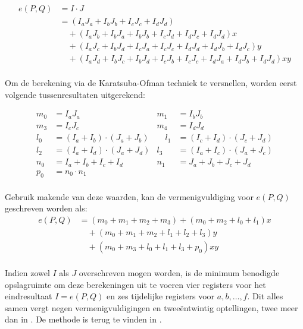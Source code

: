 \[\begin{aligned}
e(P, Q)	&= I \cdot J\\
	&= (I_a J_a + I_b J_b + I_c J_c + I_d J_d)\\
	&\quad + (I_a J_b + I_b J_a + I_b J_b + I_c J_d + I_d J_c + I_d J_d)x\\
	&\quad + (I_a J_c + I_b J_d + I_c J_a + I_c J_c + I_d J_d + I_d J_b + I_d J_c)y\\
	&\quad + (I_a J_d + I_b J_c + I_b J_d + I_c J_b + I_c J_c + I_d J_a + I_d J_b + I_d J_d)xy\\
\end{aligned}\]

Om de berekening via de Karatsuba-Ofman techniek te versnellen, worden eerst volgende tussenresultaten uitgerekend:

\[\begin{aligned}
m_0	&= I_a J_a
	&m_1	&= I_b J_b\\
m_3	&= I_c J_c
	&m_4	&= I_d J_d\\
l_0	&= (I_a + I_b) \cdot (J_a + J_b)
	&\quad l_1	&= (I_c + I_d) \cdot (J_c + J_d)\\
l_2	&= (I_a + I_d) \cdot (J_a + J_d)
	&l_3	&= (I_a + I_c) \cdot (J_a + J_c)\\
n_0	&= I_a + I_b + I_c + I_d
	&n_1	&= J_a + J_b + J_c + J_d\\
p_0	&= n_0 \cdot n_1\\
\end{aligned}\]

Gebruik makende van deze waarden, kan de vermenigvuldiging voor $e(P, Q)$ geschreven worden als:
\[\begin{aligned}
e(P, Q)	&= (m_0 + m_1 + m_2 + m_3) + (m_0 + m_2 + l_0 + l_1)x\\
	&\quad + (m_0 + m_1 + m_2 + l_1 + l_2 + l_3)y\\
	&\quad + (m_0 + m_3 + l_0 + l_1 + l_3 + p_0)xy\\
\end{aligned}\]

Indien zowel $I$ als $J$ overschreven mogen worden, is de minimum benodigde opslagruimte om deze berekeningen uit te voeren vier registers voor het eindresultaat $I = e(P, Q)$ en zes tijdelijke registers voor $a, b, \ldots, f$. Dit alles samen vergt negen vermenigvuldigingen en twee\"entwintig optellingen, twee meer dan in \cite{beuchat}. De methode is terug te vinden in .

